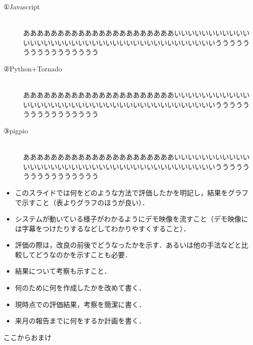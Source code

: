 \begin{description} 
	\item[①Javascript]~\\
	ああああああああああああああああああああああいいいいいいいいいいいいいいいいいいいいいいいいいいいいいいいいいいいいいいいうううううううううううううううう
	\item[②Python+Tornado]~\\
	ああああああああああああああああああああああいいいいいいいいいいいいいいいいいいいいいいいいいいいいいいいいいいいいいいいうううううううううううううううう
	\item[③pigpio]~\\
	ああああああああああああああああああああああいいいいいいいいいいいいいいいいいいいいいいいいいいいいいいいいいいいいいいいうううううううううううううううう
\end{description}
\newpage


\begin{itemize}
	\item このスライドでは何をどのような方法で評価したかを明記し，結果をグラフで示すこと（表よりグラフのほうが良い）．
	\item システムが動いている様子がわかるようにデモ映像を流すこと（デモ映像には字幕をつけたりするなどしてわかりやすくすること）．
	\item 評価の際は，改良の前後でどうなったかを示す．あるいは他の手法などと比較してどうなのかを示すことも必要．
	\item 結果について考察も示すこと．
\end{itemize}
\newpage

\begin{itemize}
	\item 何のために何を作成したかを改めて書く．
	\item 現時点での評価結果，考察を簡潔に書く．
	\item 来月の報告までに何をするか計画を書く．
\end{itemize}
\newpage

ここからおまけ




 
